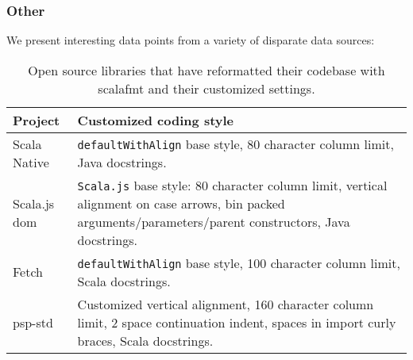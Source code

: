 \subsubsection{Other}
We present interesting data points from a variety of disparate data sources:
\begin{table}
  \caption{Open source libraries that have reformatted their codebase with scalafmt and their customized settings.}\label{tab:oss}
  \begin{tabular}{lp{90mm}}
    Project & Customized coding style \\
    \hline \hline
    Scala Native\tablefootnote{
      \url{https://github.com/scala-native/scala-native}} & \texttt{defaultWithAlign} base style,
                                                            80 character column limit,
                                                            Java docstrings. \\
    Scala.js dom\tablefootnote{
      \url{https://github.com/scala-js/scala-js-dom}}     & \texttt{Scala.js} base style:
                                                            80 character column limit,
                                                            vertical alignment on case arrows,
                                                            bin packed arguments/parameters/parent constructors,
                                                            Java docstrings. \\
    Fetch\tablefootnote{
      \url{https://github.com/47deg/fetch}}               & \texttt{defaultWithAlign} base style,
                                                            100 character column limit,
                                                            Scala docstrings. \\
    psp-std\tablefootnote{
      \url{https://github.com/paulp/psp-std}}             & Customized vertical alignment,
                                                            160 character column limit,
                                                            2 space continuation indent,
                                                            spaces in import curly braces,
                                                            Scala docstrings.

  \end{tabular}
\end{table}
